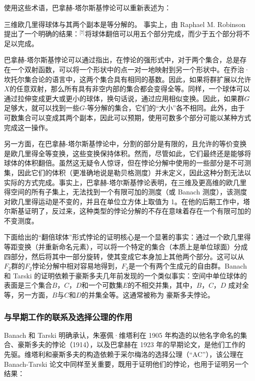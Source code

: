 使用这些术语，巴拿赫-塔尔斯基悖论可以重新表述为：

三维欧几里得球体与其两个副本是等分解的。  
事实上，由 Raphael M. Robinson 提出了一个明确的结果：\(^\text{[7]}\)将球体翻倍可以用五个部分完成，而少于五个部分将不足以完成。

巴拿赫-塔尔斯基悖论可以通过指出，在悖论的强形式中，对于两个集合，总是存在一个双射函数，可以将一个形状中的点一对一地映射到另一个形状中。在乔治·坎托尔集合论的语言中，这两个集合具有相同的基数。因此，如果将群扩展以允许\( X \)的任意双射，那么所有具有非空内部的集合都会变得全等。同样，一个球体可以通过拉伸变成更大或更小的球体，换句话说，通过应用相似变换。因此，如果群\( G \)足够大，就可以找到一些\( G \)-等分解的集合，它们的“大小”各不相同。此外，由于可数集合可以变成其两个副本，因此可以预期，使用可数多个部分可能以某种方式完成这一操作。

另一方面，在巴拿赫-塔尔斯基悖论中，分割的部分是有限的，且允许的等价变换是欧几里得全等变换，这些变换保持体积。然而，尽管如此，它们最终还是能够将球体的体积翻倍。虽然这无疑令人惊讶，但在悖论分解中使用的一些部分是不可测集，因此它们的体积（更准确地说是勒贝格测度）并未定义，因此这种分割无法以实际的方式完成。事实上，巴拿赫-塔尔斯基悖论表明，在三维及更高维的欧几里得空间的所有子集上，无法找到一个有限可加的测度（或 Banach 测度），该测度对欧几里得运动是不变的，并且在单位立方体上取值为 1。在他的后期工作中，塔尔斯基证明了，反过来，这种类型的悖论分解的不存在意味着存在一个有限可加的不变测度。

下面给出的“翻倍球体”形式悖论的证明核心是一个显著的事实：通过一个欧几里得等距变换（并重新命名元素），可以将一个特定的集合（本质上是单位球面）分成四部分，然后将其中一部分旋转，使其变成它本身加上其他两个部分。这可以从\(F_2\)群的\(F_2\)悖论分解中相对容易地得到，\(F_2\)是一个有两个生成元的自由群。Banach 和 Tarski 的证明依赖于豪斯多夫几年前发现的一个类似事实：空间中单位球体的表面是三个集合\( B \)，\( C \)，\( D \)和一个可数集\( E \)的不相交并集，其中，\( B \)，\( C \)，\( D \) 成对全等，另一方面，\( B \)与\( C \)和\( D \)的并集全等。这通常被称为 豪斯多夫悖论。
\subsubsection{与早期工作的联系及选择公理的作用}  
Banach 和 Tarski 明确承认，朱塞佩·维塔利在 1905 年构造的以他名字命名的集合、豪斯多夫的悖论（1914），以及巴拿赫在 1923 年的早期论文，是他们工作的先驱。维塔利和豪斯多夫的构造依赖于采尔梅洛的选择公理（“AC”），该公理在 Banach-Tarski 论文中同样至关重要，既用于证明他们的悖论，也用于证明另一个结果：


